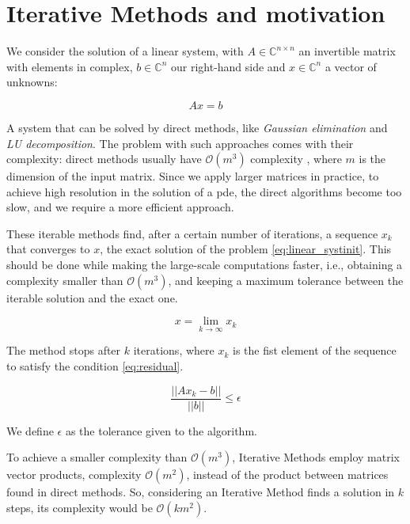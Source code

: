 \section{Iterative Methods and motivation}

We consider the solution of a linear system, with $A \in \mathbb{C}^{n \times n}$ an invertible matrix with elements in \gls{complex}, $b \in \mathbb{C}^{n}$ our right-hand side and $x\in \mathbb{C}^{n}$ a vector of unknowns:

\begin{equation}\label{eq:linear_systinit}
    Ax=b
\end{equation}


A system that can be solved by direct methods, like \textit{Gaussian elimination} and \textit{LU decomposition}. The problem with such approaches comes with their complexity: direct methods usually have $\mathcal{O}(m^{3})$ complexity \cite{trefethen1998numerical}, where $m$ is the dimension of the input matrix. Since we apply larger matrices in practice, to achieve high resolution in the solution of a \acrshort{pde}, the direct algorithms become too slow, and we require a more efficient approach.


These iterable methods find, after a certain number of iterations, a sequence ${x_{k}}$ that converges to $x$, the exact solution of the problem \ref{eq:linear_systinit}. This should be done while making the large-scale computations faster, i.e., obtaining a complexity smaller than $\mathcal{O}(m^{3})$, and keeping a maximum tolerance between the iterable solution and the exact one.


\begin{equation}\label{eq:suite}
    x = \lim_{k \to \infty} x_{k}
\end{equation}


The method stops after $k$ iterations, where $x_{k}$ is the fist element of the sequence to satisfy the condition \ref{eq:residual}.

\begin{equation}\label{eq:residual}
    \frac{||Ax_{k} - b||}{||b||} \leq \epsilon
\end{equation}

We define $\epsilon$ as the tolerance given to the algorithm.

To achieve a smaller complexity than $\mathcal{O}(m^{3})$, Iterative Methods employ matrix vector products, complexity $\mathcal{O}(m^{2})$, instead of the product between matrices found in direct methods. So, considering an Iterative Method finds a solution in $k$ steps, its complexity would be $\mathcal{O}(km^{2})$.

